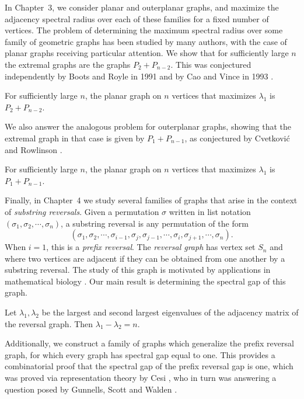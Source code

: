 In Chapter~3, we consider planar and outerplanar graphs, and maximize the adjacency
spectral radius over each of these families for a fixed number of vertices.  The problem
of determining the maximum spectral radius over some family of geometric graphs has been
studied by many authors, with the case of planar graphs receiving particular attention.
We show that for sufficiently large $n$ the extremal graphs are the graphs $P_2 + P_{n-2}$.
This was conjectured independently by Boots and Royle in 1991 \cite{BootsRoyle1991} and
by Cao and Vince in 1993 \cite{CaoVince1993}.
\begin{theorem}
  For sufficiently large $n$, the planar graph on $n$ vertices that maximizes $\lambda_1$
  is $P_2 + P_{n-2}$.
\end{theorem}
\noindent We also answer the analogous problem for outerplanar graphs, showing that
the extremal graph in that case is given by $P_1 + P_{n-1}$, as conjectured
by Cvetkovi\'{c} and Rowlinson \cite{CvetkovicRowlinson1990}.
\begin{theorem}
  For sufficiently large $n$, the planar graph on $n$ vertices that maximizes $\lambda_1$
  is $P_1 + P_{n-1}$.
\end{theorem}


Finally, in Chapter~4 we study several families of graphs that arise in the context
of \textit{substring reversals}.  Given a permutation $\sigma$ written in list notation
$(\sigma_1, \sigma_2, \cdots, \sigma_n)$, a substring reversal is any permutation
of the form
\[ (\sigma_1, \sigma_2, \cdots, \sigma_{i-1}, \sigma_j, \sigma_{j-1}, \cdots, \sigma_{i}, \sigma_{j+1}, \cdots, \sigma_n) .\]
When $i = 1$, this is a \textit{prefix reversal}.  The \textit{reversal graph} has vertex set $S_n$
and where two vertices are adjacent if they can be obtained from one another by a substring reversal.
The study of this graph is motivated by applications in mathematical biology \cite{BafnaPevzner1996}.
Our main result is determining the spectral gap of this graph.
\begin{theorem}
  Let $\lambda_1, \lambda_2$ be the largest and second largest eigenvalues
  of the adjacency matrix of the reversal graph.  Then $\lambda_1 - \lambda_2 = n$.
\end{theorem}
\noindent Additionally, we construct a family of graphs which generalize the prefix reversal graph,
for which every graph has spectral gap equal to one.  This provides a combinatorial
proof that the spectral gap of the prefix reversal gap is one, which was proved via
representation theory by Cesi \cite{Cesi2009}, who in turn was answering a question
posed by Gunnells, Scott and Walden \cite{GunnellsEtAl2007}.






